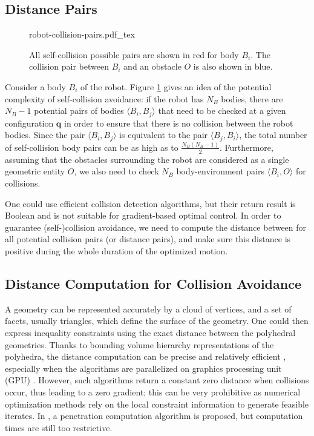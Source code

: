\subsection{Distance Pairs}

\begin{figure}
  \centering
      {\def\svgwidth{0.59\linewidth}
        
                   {robot-collision-pairs.pdf_tex}
      }
      \caption{All self-collision possible pairs are shown in red for
        body $B_i$. The collision pair between $B_i$ and an obstacle
        $O$ is also shown in blue.}
      \label{fig:chap3-robot-collision-pairs}
\end{figure}

Consider a body $B_i$ of the robot. Figure
\ref{fig:chap3-robot-collision-pairs} gives an idea of the potential
complexity of self-collision avoidance: if the robot has $N_B$ bodies,
there are $N_B-1$ potential pairs of bodies $\langle B_i,B_j\rangle$
that need to be checked at a given configuration $\mathbf{q}$ in order
to ensure that there is no collision between the robot bodies. Since
the pair $\langle B_i,B_j\rangle$ is equivalent to the pair $\langle
B_j,B_i\rangle$, the total number of self-collision body pairs can be
as high as to $\frac{N_B(N_B-1)}{2}$. Furthermore, assuming that the
obstacles surrounding the robot are considered as a single geometric
entity $O$, we also need to check $N_B$ body-environment pairs
$\langle B_i,O\rangle$ for collisions.

One could use efficient collision detection algorithms, but their
return result is Boolean and is not suitable for gradient-based
optimal control. In order to guarantee (self-)collision avoidance, we
need to compute the distance between for all potential collision pairs
(or distance pairs), and make sure this distance is positive during
the whole duration of the optimized motion.

\subsection{Distance Computation for Collision Avoidance}

A geometry can be represented accurately by a cloud of vertices, and a
set of facets, usually triangles, which define the surface of the
geometry. One could then express inequality constraints using the
exact distance between the polyhedral geometries. Thanks to bounding
volume hierarchy representations of the polyhedra, the distance
computation can be precise and relatively efficient \cite{Larsen2000},
especially when the algorithms are parallelized on graphics processing
unit (GPU) \cite{lauterbach2010gproximity}. However, such algorithms
return a constant zero distance when collisions occur, thus leading to
a zero gradient; this can be very prohibitive as numerical
optimization methods rely on the local constraint information to
generate feasible iterates. In \cite{Kim2002}, a penetration
computation algorithm is proposed, but computation times are still too
restrictive. 

